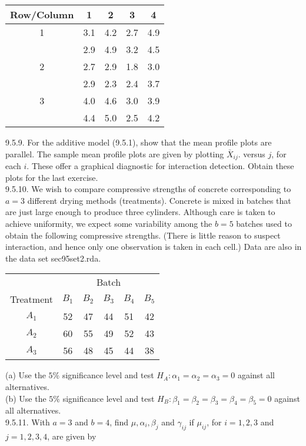 \begin{center}
\begin{tabular}{ccccc}
\hline
Row/Column & 1 & 2 & 3 & 4 \\
\hline
1 & 3.1 & 4.2 & 2.7 & 4.9 \\
 & 2.9 & 4.9 & 3.2 & 4.5 \\
2 & 2.7 & 2.9 & 1.8 & 3.0 \\
 & 2.9 & 2.3 & 2.4 & 3.7 \\
3 & 4.0 & 4.6 & 3.0 & 3.9 \\
 & 4.4 & 5.0 & 2.5 & 4.2 \\
\hline
\end{tabular}
\end{center}

9.5.9. For the additive model (9.5.1), show that the mean profile plots are parallel. The sample mean profile plots are given by plotting $\bar{X}_{i j}$. versus $j$, for each $i$. These offer a graphical diagnostic for interaction detection. Obtain these plots for the last exercise.\\
9.5.10. We wish to compare compressive strengths of concrete corresponding to $a=3$ different drying methods (treatments). Concrete is mixed in batches that are just large enough to produce three cylinders. Although care is taken to achieve uniformity, we expect some variability among the $b=5$ batches used to obtain the following compressive strengths. (There is little reason to suspect interaction, and hence only one observation is taken in each cell.) Data are also in the data set sec95set2.rda.

\begin{center}
\begin{tabular}{cccccc}
\hline
 & \multicolumn{5}{c}{Batch} \\
\cline { 2 - 6 }
Treatment & $B_{1}$ & $B_{2}$ & $B_{3}$ & $B_{4}$ & $B_{5}$ \\
\hline
$A_{1}$ & 52 & 47 & 44 & 51 & 42 \\
$A_{2}$ & 60 & 55 & 49 & 52 & 43 \\
$A_{3}$ & 56 & 48 & 45 & 44 & 38 \\
\hline
\end{tabular}
\end{center}

(a) Use the $5 \%$ significance level and test $H_{A}: \alpha_{1}=\alpha_{2}=\alpha_{3}=0$ against all alternatives.\\
(b) Use the $5 \%$ significance level and test $H_{B}: \beta_{1}=\beta_{2}=\beta_{3}=\beta_{4}=\beta_{5}=0$ against all alternatives.\\
9.5.11. With $a=3$ and $b=4$, find $\mu, \alpha_{i}, \beta_{j}$ and $\gamma_{i j}$ if $\mu_{i j}$, for $i=1,2,3$ and $j=1,2,3,4$, are given by

